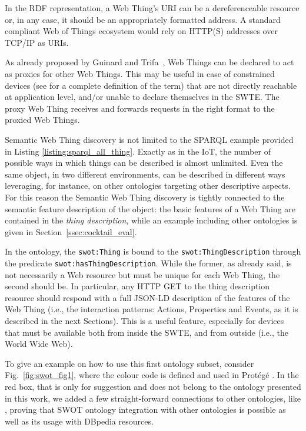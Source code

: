 In the RDF representation, a Web Thing's URI can be a dereferenceable resource or, in any case, it should be an appropriately formatted address. A standard compliant Web of Things ecosystem would rely on HTTP(S) addresses over TCP/IP as URIs.

As already proposed by Guinard and Trifa~\cite{guinard2016building}, Web Things can be declared to act as proxies for other Web Things. This may be useful in case of constrained devices (see \cite{bormann2014terminology} for a complete definition of the term) that are not directly reachable at application level, and/or unable to declare themselves in the SWTE. The proxy Web Thing receives and forwards requests in the right format to the proxied Web Things.

Semantic Web Thing discovery is not limited to the SPARQL example provided in Listing \ref{listing:sparql_all_thing}. Exactly as in the IoT, the number of possible ways in which things can be described is almost unlimited. Even the same object, in two different environments, can be described in different ways leveraging, for instance, on other ontologies targeting other descriptive aspects. For this reason the Semantic Web Thing discovery is tightly connected to the semantic feature description of the object: the basic features of a Web Thing are contained in the \textit{thing description}, while an example including other ontologies is given in Section~\ref{ssec:cocktail_eval}. 

In the ontology, the \texttt{swot:Thing} is bound to the \texttt{swot:ThingDescription} through the predicate \texttt{swot:hasThingDescription}. While the former, as already said, is not necessarily a Web resource but must be unique for each Web Thing, the second should be. In particular, any HTTP GET to the thing description resource should respond with a full JSON-LD description of the features of the Web Thing (i.e., the interaction patterns: Actions, Properties and Events, as it is described in the next Sections). This is a useful feature, especially for devices that must be available both from inside the SWTE, and from outside (i.e., the World Wide Web).

To give an example on how to use this first ontology subset, consider Fig.~\ref{fig:swot_fig1}, where the colour code is defined and used in Prot\'{e}g\'{e} \cite{musen2015protege}. In the red box, that is only for suggestion and does not belong to the ontology presented in this work, we added a few straight-forward connections to other ontologies, like , proving that SWOT ontology integration with other ontologies is possible as well as its usage with DBpedia resources.

